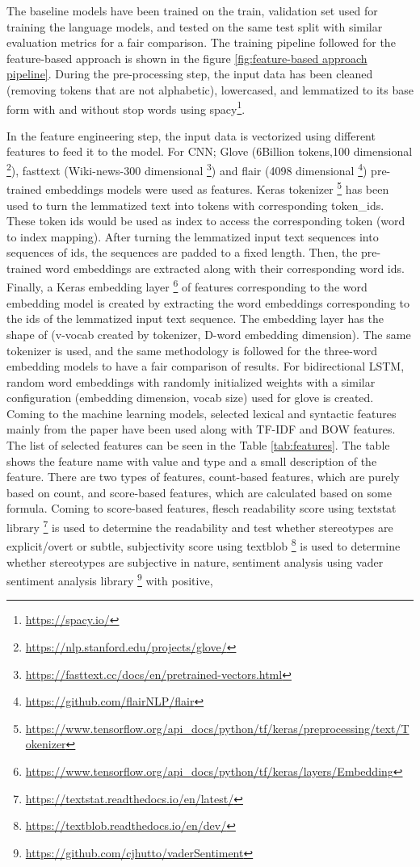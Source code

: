 The baseline models have been trained on the train, validation set used for training the language models, and tested on the same test split with similar evaluation metrics for a fair comparison. The training pipeline followed for the feature-based approach is shown in the figure \ref{fig:feature-based approach pipeline}. During the pre-processing step, the input data has been cleaned (removing tokens that are not alphabetic), lowercased, and lemmatized to its base form with and without stop words using spacy\footnote{\url{https://spacy.io/}}. 


In the feature engineering step, the input data is vectorized using different features to feed it to the model. For CNN; Glove (6Billion tokens,100 dimensional \footnote{\url{https://nlp.stanford.edu/projects/glove/}}), fasttext (Wiki-news-300 dimensional \footnote{\url{https://fasttext.cc/docs/en/pretrained-vectors.html}}) and flair (4098 dimensional \footnote{\url{https://github.com/flairNLP/flair}}) pre-trained embeddings models were used as features. Keras tokenizer \footnote{\url{https://www.tensorflow.org/api_docs/python/tf/keras/preprocessing/text/Tokenizer}} has been used to turn the lemmatized text into tokens with corresponding token\_ids. These token ids would be used as index to access the corresponding token (word to index mapping). After turning the lemmatized input text sequences into sequences of ids, the sequences are padded to a fixed length. Then, the pre-trained word embeddings are extracted along with their corresponding word ids. Finally, a Keras embedding layer \footnote{\url{https://www.tensorflow.org/api_docs/python/tf/keras/layers/Embedding}} of features corresponding to the word embedding model is created by extracting the word embeddings corresponding to the ids of the lemmatized input text sequence. The embedding layer has the shape of (v-vocab created by tokenizer, D-word embedding dimension). The same tokenizer is used, and the same methodology is followed for the three-word embedding models to have a fair comparison of results. For bidirectional LSTM, random word embeddings with randomly initialized weights with a similar configuration (embedding dimension, vocab size) used for glove is created. Coming to the machine learning models, selected lexical and syntactic features mainly from the paper \cite{recasens2013linguistic}  have been used along with TF-IDF and BOW features. The list of selected features can be seen in the Table \ref{tab:features}. The table shows the feature name with value and type and a small description of the feature. There are two types of features, count-based features, which are purely based on count, and score-based features, which are calculated based on some formula. Coming to score-based features, flesch readability score \cite{flesch1948new} using textstat library \footnote{\url{https://textstat.readthedocs.io/en/latest/}} is used to determine the readability and test whether stereotypes are explicit/overt or subtle, subjectivity score using textblob \footnote{\url{https://textblob.readthedocs.io/en/dev/}} is used to determine whether stereotypes are subjective in nature, sentiment analysis using vader sentiment analysis library \footnote{\url{https://github.com/cjhutto/vaderSentiment}} with positive, 